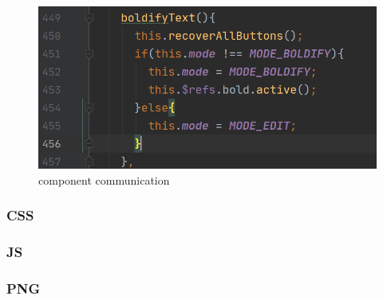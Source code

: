 \documentclass[11pt]{article}
\begin{document}
\begin{spacing}{1.0}
	\begin{figure}[H]
	\centering
	\includegraphics[scale=.3]{figures/componentsRefs.png}
	\caption{component communication}
	\label{fig:9}
\end{figure}
	\subsubsection{CSS}
	\subsubsection{JS}
	\subsubsection{PNG}

\end{spacing}
\end{document}
